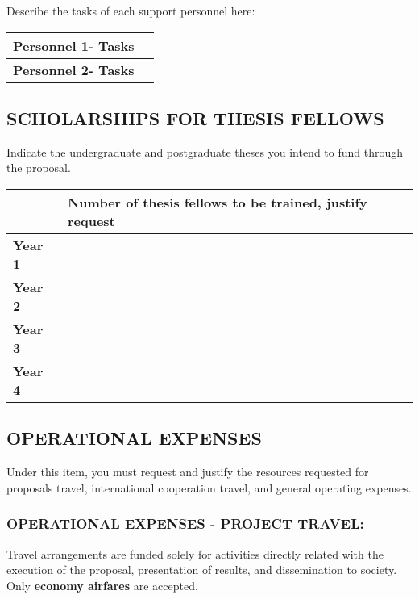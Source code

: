 \documentclass[MAIN.tex]{subfiles}
\begin{document}
\noindent Describe the tasks of each support personnel here:

\smallskip

\noindent\begin{tabularx}{\linewidth}{|m{.3\linewidth}|X|}
\hline
\cellcolor{tcc}\textbf{Personnel 1- Tasks} & \\\hline
\cellcolor{tcc}\textbf{Personnel 2- Tasks} & \\\hline
\end{tabularx}


\subsection*{\uppercase{Scholarships for thesis fellows}}

Indicate the undergraduate and postgraduate theses you intend to fund through the proposal.

\medskip

\noindent\begin{tabularx}{\textwidth}{m{3.23cm}|X|}
\hhline{~-}
& \cellcolor{tcc}\textbf{Number of thesis fellows to be trained, justify request}\\
\hline
\multicolumn{1}{|l|}{\cellcolor{tcc}\textbf{Year 1}} & \\
\hline
\multicolumn{1}{|l|}{\cellcolor{tcc}\textbf{Year 2}} & \\
\hline
\multicolumn{1}{|l|}{\cellcolor{tcc}\textbf{Year 3}} & \\
\hline
\multicolumn{1}{|l|}{\cellcolor{tcc}\textbf{Year 4}} & \\
\hline
\end{tabularx}


\subsection*{\uppercase{Operational expenses}}

Under this item, you must request and justify the resources requested for proposals travel, international cooperation travel, and general operating expenses.

\subsubsection*{\uppercase{Operational expenses - Project travel:}}

Travel arrangements are funded solely for activities directly related with the execution of the proposal, presentation of results, and dissemination to society.
Only \textbf{economy airfares} are accepted.
\end{document}
